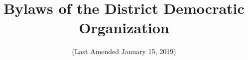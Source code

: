 \documentclass{article}
\begin{document}
\title{Bylaws of the \fortythird{} District Democratic Organization}
\date{(Last Amended January 15, 2019)}
\maketitle

\setcounter{tocdepth}{1}
\tableofcontents


\end{document}
